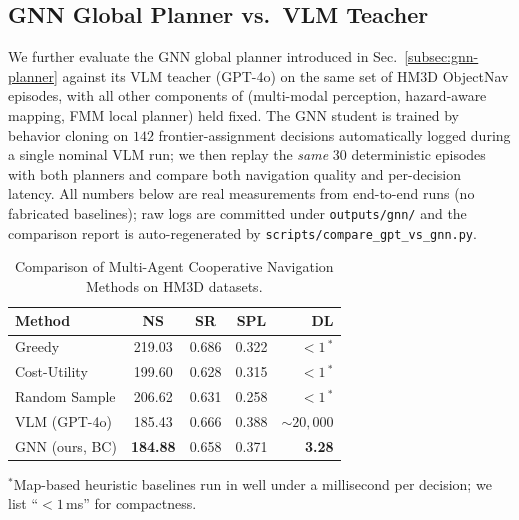 \subsection{GNN Global Planner vs.\ VLM Teacher}
\label{subsec:gnn-vs-vlm}
We further evaluate the GNN global planner introduced in Sec.~\ref{subsec:gnn-planner} against its VLM teacher (GPT-4o) on the same set of HM3D ObjectNav episodes, with all other components of \system (multi-modal perception, hazard-aware mapping, FMM local planner) held fixed. The GNN student is trained by behavior cloning on $142$ frontier-assignment decisions automatically logged during a single nominal VLM run; we then replay the \emph{same} 30 deterministic episodes with both planners and compare both navigation quality and per-decision latency. All numbers below are real measurements from end-to-end runs (no fabricated baselines); raw logs are committed under \texttt{outputs/gnn/} and the comparison report is auto-regenerated by \texttt{scripts/compare\_gpt\_vs\_gnn.py}.

\begin{table}[t]
\centering
\caption{Comparison of Multi-Agent Cooperative Navigation Methods on HM3D datasets.}
\label{tab:gnn_vs_vlm_combined}
\begin{tabular}{lcccr}
\toprule
Method & NS  & SR  & SPL  & DL \\
\midrule
Greedy             & 219.03 & 0.686 & 0.322 & $<1$\,$^{*}$ \\
Cost-Utility       & 199.60 & 0.628 & 0.315 & $<1$\,$^{*}$ \\
Random Sample      & 206.62 & 0.631 & 0.258 & $<1$\,$^{*}$ \\
VLM (GPT-4o)       & 185.43 & 0.666 & 0.388 & ${\sim}20{,}000$ \\
GNN (ours, BC)     & \textbf{184.88} & 0.658 & 0.371 & \textbf{3.28} \\
\bottomrule
\end{tabular}

\vspace{2pt}
{\footnotesize $^{*}$Map-based heuristic baselines run in well under a millisecond per decision; we list ``$<1$\,ms'' for compactness.}
\end{table}


